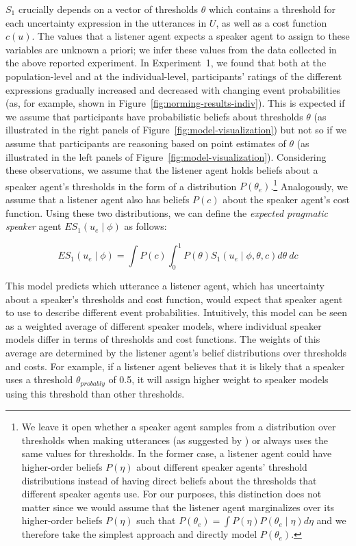 \documentclass[man, floatsintext]{apa6}
\begin{document}
$S_1$ crucially depends on a vector of thresholds $\theta$ which contains a threshold for each uncertainty expression in the utterances in $U$, 
as well as  a cost function $c(u)$. The values that a listener agent expects a speaker agent to assign 
to these variables are unknown a priori; we infer these values from the data collected in the above reported experiment. 
In Experiment~1, we found that both at the population-level and at the individual-level, 
participants' ratings of the different expressions gradually increased and decreased with changing event probabilities 
(as, for example, shown in Figure~\ref{fig:norming-results-indiv}). This is expected if we assume that participants
have probabilistic beliefs about thresholds $\theta$ (as illustrated in the right panels of Figure~\ref{fig:model-visualization}) but not so if we assume that
participants are reasoning based on point estimates of $\theta$ (as illustrated in the left panels of Figure~\ref{fig:model-visualization}).
Considering these observations,  we assume that the listener agent holds beliefs about a speaker agent's thresholds  in the form of a distribution $P\left(\theta_e\right)$.\footnote{We leave it open 
whether a speaker agent samples from a distribution over thresholds when making utterances (as suggested by \textcite{Qing2015}) 
or always uses the same values for thresholds. In the former case, a listener agent could have higher-order beliefs  $P(\eta)$ 
about different speaker agents' threshold distributions instead of having direct beliefs about the thresholds that different 
speaker agents use. For our purposes, this distinction does not matter since we would assume that the listener agent marginalizes over its higher-order beliefs $P(\eta)$ such that  $P\left(\theta_e\right) = \int P\left(\eta\right) P\left(\theta_e \mid \eta\right) d\eta$ and we therefore take the simplest approach and directly model $P\left(\theta_e\right)$. } Analogously, we assume that a listener agent also has beliefs $P(c)$ about the speaker agent's cost function.
Using these two distributions, we can define the \textit{expected pragmatic speaker} agent $ES_1\left(u_e \mid \phi \right)$ as follows:

$$ES_1\left(u_e \mid \phi \right) = \int P(c) \int_0^1 P(\theta) S_1\left(u _e\mid \phi, \theta, c\right) d\theta \  d c$$

This model predicts which utterance a listener agent, which has uncertainty about a speaker's thresholds and cost function, would expect that speaker agent to use to describe different event probabilities.
Intuitively, this model can be seen as a weighted average of different speaker models, where individual speaker models differ in terms of thresholds and cost functions.  The weights of this average are determined by the 
listener agent's belief distributions over thresholds and costs. For example, if a listener agent believes that it is likely that a speaker uses a threshold $\theta_{probably}$ of 0.5, it will assign higher weight to speaker models
using this threshold than other thresholds. 
\end{document}
